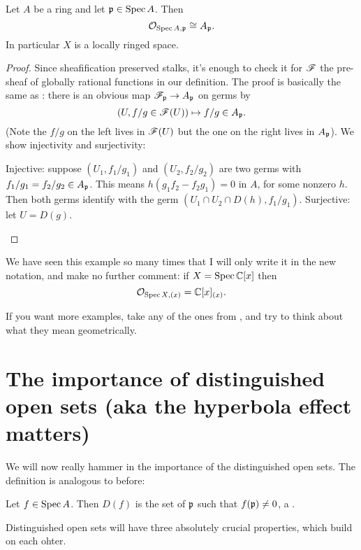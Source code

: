 \begin{theorem}
	Let $A$ be a ring and let $\mathfrak p \in \operatorname{Spec} A$.
	Then \[ \mathcal O_{\operatorname{Spec} A, \mathfrak p} \cong A_\mathfrak p. \]
	In particular $X$ is a locally ringed space.
\end{theorem}
\begin{proof}
	Since sheafification preserved stalks,
	it's enough to check it for $\mathscr F$ the pre-sheaf
	of globally rational functions in our definition.
	The proof is basically the same as :
	there is an obvious map $\mathscr F_\mathfrak p \to A_\mathfrak p$ on germs by
	\[ \left(U, f/g \in \mathscr F(U) \right)
		\mapsto f/g \in A_\mathfrak p . \]
	(Note the $f/g$ on the left lives in $\mathscr F(U)$
	but the one on the right lives in $A_\mathfrak p$).
	We show injectivity and surjectivity:
	\begin{itemize}
		\ii Injective: suppose $(U_1, f_1 / g_1)$ and $(U_2, f_2 / g_2)$
		are two germs with $f_1/g_1 = f_2/g_2 \in A_\mathfrak p$.
		This means $h(g_1 f_2 - f_2 g_1) = 0$ in $A$, for some nonzero $h$.
		Then both germs identify with
		the germ $(U_1 \cap U_2 \cap D(h), f_1 / g_1)$.
		\ii Surjective: let $U = D(g)$. \qedhere
	\end{itemize}
\end{proof}

\begin{example}
	We have seen this example so many times
	that I will only write it in the new notation,
	and make no further comment:
	if $X = \operatorname{Spec} \mathbb C[x]$ then
	\[ \mathcal O_{\operatorname{Spec} X, (x)} = \mathbb C[x]_{(x)}. \]
\end{example}

If you want more examples,
take any of the ones from ,
and try to think about what they mean geometrically.

\section{The importance of distinguished open sets (aka the hyperbola effect matters)}

We will now really hammer in the importance of
the distinguished open sets.
The definition is analogous to before:
\begin{definition}
	Let $f \in \operatorname{Spec} A$.
	Then $D(f)$ is the set of $\mathfrak p$ such that $f(\mathfrak p) \neq 0$,
	a .
\end{definition}
Distinguished open sets will have three absolutely crucial properties,
which build on each ohter.

